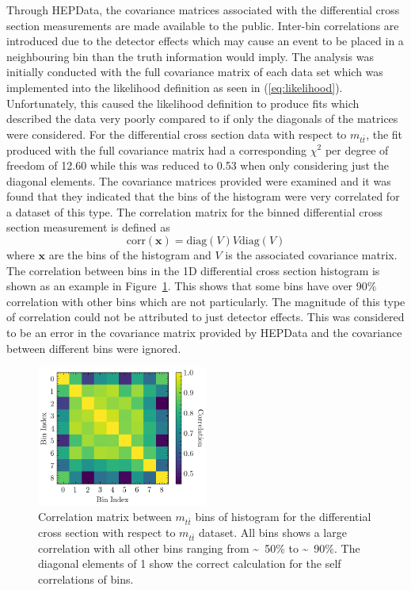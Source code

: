 \documentclass[a4paper,11pt]{article}
\renewcommand{\vec}{\mathbf}
\begin{document}
Through HEPData, the covariance matrices associated with the differential cross section measurements are made available to the public.
Inter-bin correlations are introduced due to the detector effects which may cause an event to be placed in a neighbouring bin than the truth information would imply.
The analysis was initially conducted with the full covariance matrix of each data set which was implemented into the likelihood definition as seen in (\ref{eq:likelihood}).
Unfortunately, this caused the likelihood definition to produce fits which described the data very poorly compared to if only the diagonals of the matrices were considered.
For the differential cross section data with respect to $m_{t\bar{t}}$, the fit produced with the full covariance matrix had a corresponding $\chi^2$ per degree of freedom of 12.60 while this was reduced to 0.53 when only considering just the diagonal elements.
The covariance matrices provided were examined and it was found that they indicated that the bins of the histogram were very correlated for a dataset of this type.
The correlation matrix for the binned differential cross section measurement is defined as
\begin{equation}
    \textrm{corr}(\vec{x}) = \textrm{diag}(V) V \textrm{diag}(V)
\end{equation}
where $\vec{x}$ are the bins of the histogram and $V$ is the associated covariance matrix.
The correlation between bins in the 1D differential cross section histogram is shown as an example in Figure~\ref{fig:correlation}.
This shows that some bins have over 90\% correlation with other bins which are not particularly.
The magnitude of this type of correlation could not be attributed to just detector effects.
This was considered to be an error in the covariance matrix provided by HEPData and the covariance between different bins were ignored.

\begin{figure}[H]
    \centering
    \includegraphics[width=0.5\textwidth]{plots/correlation.png}
    \caption{Correlation matrix between $m_{t\bar{t}}$ bins of histogram for the differential cross section with respect to $m_{t\bar{t}}$ dataset. All bins shows a large correlation with all other bins ranging from \textasciitilde~50\% to \textasciitilde~90\%. The diagonal elements of 1 show the correct calculation for the self correlations of bins.}
    \label{fig:correlation}
\end{figure}
\end{document}
